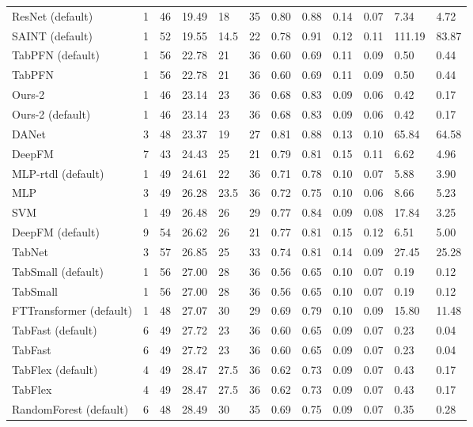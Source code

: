 \begin{tabular}{lllllrllllll}
ResNet (default) & 1 & 46 & 19.49 & 18 & 35 & 0.80 & 0.88 & 0.14 & 0.07 & 7.34 & 4.72 \\
SAINT (default) & 1 & 52 & 19.55 & 14.5 & 22 & 0.78 & 0.91 & 0.12 & 0.11 & 111.19 & 83.87 \\
TabPFN (default) & 1 & 56 & 22.78 & 21 & 36 & 0.60 & 0.69 & 0.11 & 0.09 & 0.50 & 0.44 \\
TabPFN & 1 & 56 & 22.78 & 21 & 36 & 0.60 & 0.69 & 0.11 & 0.09 & 0.50 & 0.44 \\
Ours-2 & 1 & 46 & 23.14 & 23 & 36 & 0.68 & 0.83 & 0.09 & 0.06 & 0.42 & 0.17 \\
Ours-2 (default) & 1 & 46 & 23.14 & 23 & 36 & 0.68 & 0.83 & 0.09 & 0.06 & 0.42 & 0.17 \\
DANet & 3 & 48 & 23.37 & 19 & 27 & 0.81 & 0.88 & 0.13 & 0.10 & 65.84 & 64.58 \\
DeepFM & 7 & 43 & 24.43 & 25 & 21 & 0.79 & 0.81 & 0.15 & 0.11 & 6.62 & 4.96 \\
MLP-rtdl (default) & 1 & 49 & 24.61 & 22 & 36 & 0.71 & 0.78 & 0.10 & 0.07 & 5.88 & 3.90 \\
MLP & 3 & 49 & 26.28 & 23.5 & 36 & 0.72 & 0.75 & 0.10 & 0.06 & 8.66 & 5.23 \\
SVM & 1 & 49 & 26.48 & 26 & 29 & 0.77 & 0.84 & 0.09 & 0.08 & 17.84 & 3.25 \\
DeepFM (default) & 9 & 54 & 26.62 & 26 & 21 & 0.77 & 0.81 & 0.15 & 0.12 & 6.51 & 5.00 \\
TabNet & 3 & 57 & 26.85 & 25 & 33 & 0.74 & 0.81 & 0.14 & 0.09 & 27.45 & 25.28 \\
TabSmall (default) & 1 & 56 & 27.00 & 28 & 36 & 0.56 & 0.65 & 0.10 & 0.07 & 0.19 & 0.12 \\
TabSmall & 1 & 56 & 27.00 & 28 & 36 & 0.56 & 0.65 & 0.10 & 0.07 & 0.19 & 0.12 \\
FTTransformer (default) & 1 & 48 & 27.07 & 30 & 29 & 0.69 & 0.79 & 0.10 & 0.09 & 15.80 & 11.48 \\
TabFast (default) & 6 & 49 & 27.72 & 23 & 36 & 0.60 & 0.65 & 0.09 & 0.07 & 0.23 & 0.04 \\
TabFast & 6 & 49 & 27.72 & 23 & 36 & 0.60 & 0.65 & 0.09 & 0.07 & 0.23 & 0.04 \\
TabFlex (default) & 4 & 49 & 28.47 & 27.5 & 36 & 0.62 & 0.73 & 0.09 & 0.07 & 0.43 & 0.17 \\
TabFlex & 4 & 49 & 28.47 & 27.5 & 36 & 0.62 & 0.73 & 0.09 & 0.07 & 0.43 & 0.17 \\
RandomForest (default) & 6 & 48 & 28.49 & 30 & 35 & 0.69 & 0.75 & 0.09 & 0.07 & 0.35 & 0.28 \\

\end{tabular}
